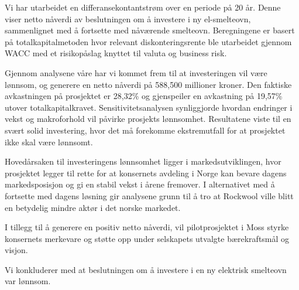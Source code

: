 Vi har utarbeidet en differansekontantstrøm over en periode på 20 år. Denne viser netto nåverdi av beslutningen om å investere i ny el-smelteovn, sammenlignet med å fortsette med nåværende smelteovn. Beregningene er basert på totalkapitalmetoden hvor relevant diskonteringsrente ble utarbeidet gjennom WACC med et risikopåslag knyttet til valuta og business risk. 

\indent \newline
Gjennom analysene våre har vi kommet frem til at investeringen vil være lønnsom, og generere en netto nåverdi på 588,500 millioner kroner. Den faktiske avkastningen på prosjektet er 28,32\% og gjenspeiler en avkastning på 19,57\% utover totalkapitalkravet. Sensitivitetsanalysen synliggjorde hvordan endringer i vekst og makroforhold vil påvirke prosjekts lønnsomhet. Resultatene viste til en svært solid investering, hvor det må forekomme ekstremutfall for at prosjektet ikke skal være lønnsomt. 

\indent \newline
Hovedårsaken til investeringens lønnsomhet ligger i markedsutviklingen, hvor prosjektet  legger til rette for at konsernets avdeling i Norge kan bevare dagens markedsposisjon og gi en stabil vekst i årene fremover. I alternativet med å fortsette med dagens løsning gir analysene grunn til å tro at Rockwool ville blitt en betydelig mindre aktør i det norske markedet.

\indent \newline
I tillegg til å generere en positiv netto nåverdi, vil pilotprosjektet i Moss styrke konsernets merkevare og støtte opp under selskapets utvalgte bærekraftsmål og visjon.

\indent \newline
Vi konkluderer med at beslutningen om å investere i en ny elektrisk smelteovn var lønnsom.
